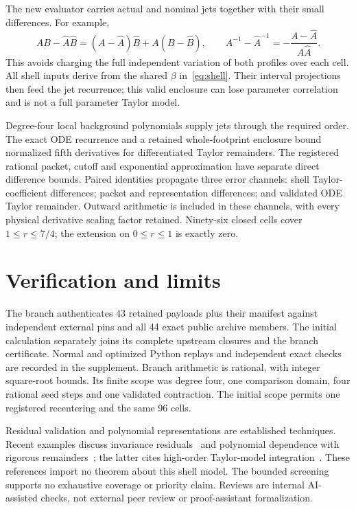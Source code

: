 \documentclass[11pt]{article}
\begin{document}
The new evaluator carries actual and nominal jets together with their
small differences. For example,
\[
 AB-\widehat A\widehat B=(A-\widehat A)\widehat B+A(B-\widehat B),\qquad
 A^{-1}-\widehat A^{-1}=-\frac{A-\widehat A}{A\widehat A}.
\]
This avoids charging the full independent variation of both profiles over
each cell. All shell inputs derive from the shared $\beta$ in~\eqref{eq:shell}.
Their interval projections then feed the jet recurrence; this valid enclosure
can lose parameter correlation and is not a full parameter Taylor model.

Degree-four local background polynomials supply jets through the required
order. The exact ODE recurrence and a retained whole-footprint enclosure
bound normalized fifth derivatives for differentiated Taylor remainders.
The registered rational packet, cutoff and exponential approximation have
separate direct difference bounds. Paired identities propagate three error
channels: shell Taylor-coefficient differences; packet and representation
differences; and validated ODE Taylor remainder. Outward arithmetic is included
in these channels, with every physical derivative scaling factor retained.
Ninety-six closed cells cover $1\leq r\leq7/4$; the extension on
$0\leq r\leq1$ is exactly zero.



\section{Verification and limits}
The branch authenticates 43 retained payloads plus their manifest against
independent external pins and all 44 exact public archive members. The initial
calculation separately joins its complete upstream closures and the branch
certificate. Normal and optimized Python replays and independent exact checks
are recorded in the supplement. Branch arithmetic is rational, with integer
square-root bounds. Its finite scope was degree four, one comparison domain,
four rational seed steps and one validated contraction. The initial scope
permits one registered recentering and the same 96 cells.

Residual validation and polynomial representations are established techniques.
Recent examples discuss invariance residuals~\cite{henot} and polynomial
dependence with rigorous remainders~\cite{tera}; the latter cites high-order
Taylor-model integration~\cite{berz}. These references import no theorem about
this shell model. The bounded screening supports no exhaustive coverage or
priority claim. Reviews are internal AI-assisted checks, not external peer
review or proof-assistant formalization.
\end{document}
